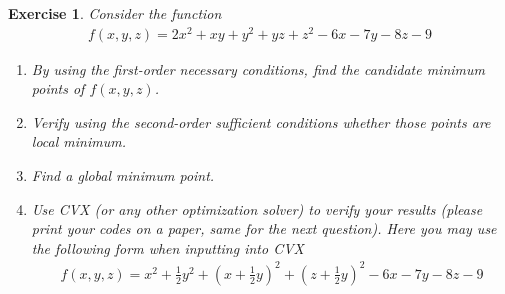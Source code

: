 \documentclass[12pt]{article}
\theoremstyle{colon}
\newtheorem{exercise}{Exercise}
\begin{document}
\clearpage

\begin{exercise}
  Consider the function
  \begin{gather*}
    f(x,y,z) = 2x^2 + xy + y^2 + yz + z^2 -6x -7y -8z -9
  \end{gather*}
  \begin{enumerate}[label=\arabic*)]
    \item By using the first-order necessary conditions, find the candidate minimum points of $f(x,y,z)$.
    \item Verify using the second-order sufficient conditions whether those points are local minimum.
    \item Find a global minimum point.
    \item Use CVX (or any other optimization solver) to verify your results (please print your codes on a paper, same for the next question). Here you may use the following form when inputting into CVX
    \begin{gather*}
      f(x,y,z) = x^2 + \frac{1}{2}y^2 + \left(x + \frac{1}{2}y \right)^2 + \left( z + \frac{1}{2}y \right)^2 -6x -7y -8z -9
    \end{gather*}
  \end{enumerate}
\end{exercise}
\end{document}
